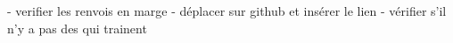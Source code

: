 - verifier les renvois en marge
- déplacer sur github et insérer le lien
- vérifier s'il n'y a pas des  qui trainent
